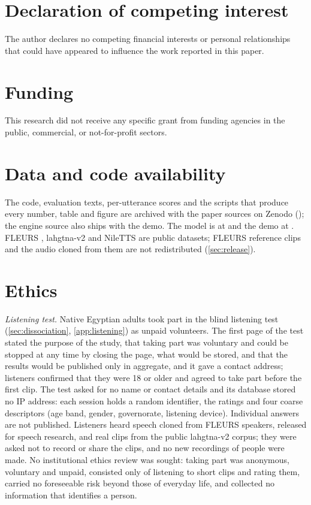 \section*{Declaration of competing interest}
The author declares no competing financial interests or personal relationships that could have appeared to
influence the work reported in this paper.

\section*{Funding}
This research did not receive any specific grant from funding agencies in the public, commercial, or not-for-profit
sectors.

\section*{Data and code availability}
The code, evaluation texts, per-utterance scores and the scripts that produce every number, table and figure are
archived with the paper sources on Zenodo (\zenodo); the engine source also ships with the demo. The model is at \hfmodel and the demo at \hfspace. FLEURS \citep{conneau2023fleurs}, lahgtna-v2 \citep{oddadmix2026lahgtnadata}
and NileTTS \citep{khamis2026niletts} are public datasets; FLEURS reference clips and the audio cloned from them are not
redistributed (\cref{sec:release}).

\section*{Ethics}
\emph{Listening test.} Native Egyptian adults took part in the blind listening test (\cref{sec:dissociation},
\cref{app:listening}) as unpaid volunteers. The first page of the test stated the purpose of the study, that taking part was
voluntary and could be stopped at any time by closing the page, what would be stored, and that the results would be
published only in aggregate, and it gave a contact address; listeners confirmed that they were 18 or older and agreed to
take part before the first clip. The test asked for no name or contact details and its database stored no IP address:
each session holds a random identifier, the ratings and four coarse descriptors (age band, gender, governorate,
listening device). Individual answers are not published. Listeners heard speech cloned from FLEURS speakers, released for
speech research, and real clips from the public lahgtna-v2 corpus; they were asked not to record or share the clips, and
no new recordings of people were made. No institutional ethics review was sought: taking part was anonymous, voluntary and unpaid, consisted only of listening to short clips and rating them, carried no foreseeable risk beyond those of everyday life, and collected no information that identifies a person.

